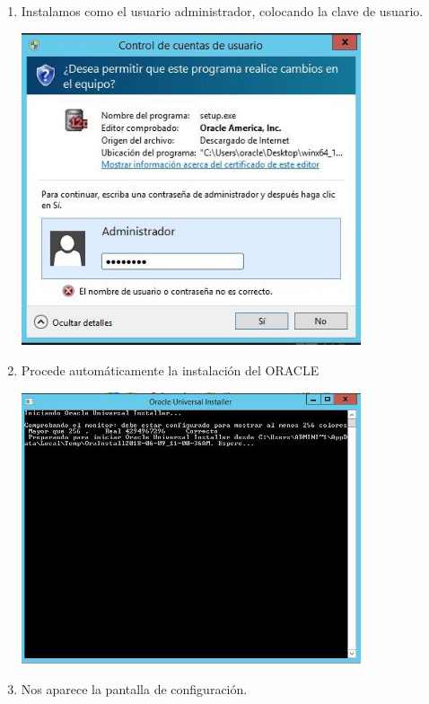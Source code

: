 \begin{enumerate}[1.]
\begin{center}
	\end{center}
	\hfill \break
	\hfill \break
	\hfill \break
	\hfill \break
	\hfill \break
	\item Instalamos como el usuario administrador, colocando la clave de usuario.\\
	\begin{center}
	\includegraphics[width=10cm]{./Imagenes/jhordy6} 
	\end{center}
	\hfill \break
	\hfill \break
	\hfill \break
	\hfill \break
	\item Procede autom\'aticamente la instalaci\'on del ORACLE\\
	\begin{center}
	\includegraphics[width=10cm]{./Imagenes/jhordy7} 
	\end{center}
	\hfill \break
	\hfill \break
	\hfill \break
	\hfill \break
	\hfill \break
	\hfill \break
	\hfill \break
	\hfill \break
	\hfill \break
	\item Nos aparece la pantalla de configuraci\'on.\\

\end{enumerate}
